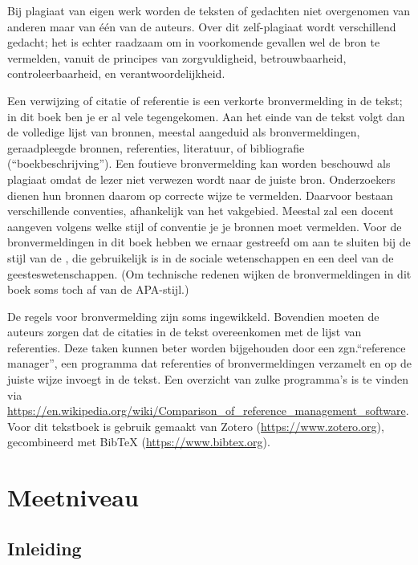 \documentclass[
]{book}
\begin{document}
Bij plagiaat van eigen werk worden de teksten of gedachten niet
overgenomen van anderen maar van één van de auteurs. Over dit
zelf-plagiaat wordt verschillend gedacht; het is echter raadzaam om in
voorkomende gevallen wel de bron te vermelden, vanuit de principes van
zorgvuldigheid, betrouwbaarheid, controleerbaarheid, en
verantwoordelijkheid.

Een verwijzing of citatie of referentie is een verkorte bronvermelding
in de tekst; in dit boek ben je er al vele tegengekomen. Aan het
einde van de tekst volgt dan de volledige
lijst van bronnen, meestal aangeduid als bronvermeldingen, geraadpleegde
bronnen, referenties, literatuur, of bibliografie (``boekbeschrijving'').
Een foutieve bronvermelding kan worden beschouwd als plagiaat \citep{UBVU15}
omdat de lezer niet verwezen wordt naar de juiste bron. Onderzoekers
dienen hun bronnen daarom op correcte wijze te vermelden. Daarvoor
bestaan verschillende conventies, afhankelijk van het vakgebied. Meestal
zal een docent aangeven volgens welke stijl of conventie je je bronnen
moet vermelden. Voor de bronvermeldingen in dit boek hebben we ernaar gestreefd om aan te sluiten bij de stijl van de \citet{APA10}, die
gebruikelijk is in de sociale wetenschappen en een deel van de
geesteswetenschappen.
(Om technische redenen wijken de bronvermeldingen in dit boek soms toch af van de APA-stijl.)

De regels voor bronvermelding zijn soms ingewikkeld. Bovendien moeten de
auteurs zorgen dat de citaties in de tekst overeenkomen met de lijst van
referenties. Deze taken kunnen beter worden bijgehouden door een
zgn.``reference manager'', een programma dat referenties of
bronvermeldingen verzamelt en op de juiste wijze invoegt in de tekst.
Een overzicht van zulke programma's is te vinden via
\url{https://en.wikipedia.org/wiki/Comparison_of_reference_management_software}.
Voor dit tekstboek is gebruik gemaakt van Zotero (\url{https://www.zotero.org}),
gecombineerd met BibTeX (\url{https://www.bibtex.org}).

\hypertarget{ch:Meetniveau}{%
\chapter{Meetniveau}\label{ch:Meetniveau}}

\hypertarget{inleiding-1}{%
\section{Inleiding}\label{inleiding-1}}
\end{document}
